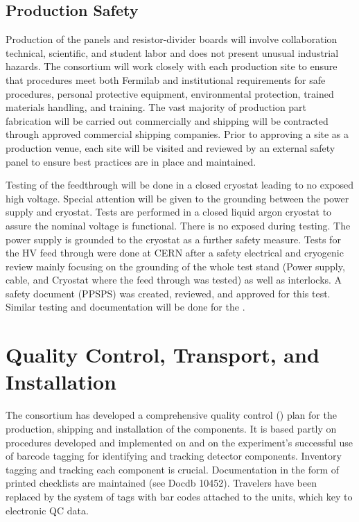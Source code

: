 \subsection{Production Safety}
\label{sec:fdsp-hv-prod-safety}

Production of the  panels and resistor-divider boards will involve collaboration technical, scientific, and student labor and  does not present unusual industrial hazards. The  consortium will work closely with each production site to ensure that procedures meet both Fermilab and institutional requirements for safe procedures, personal protective equipment, environmental protection, trained materials handling, and training. The vast majority of production part fabrication will be carried out commercially and shipping will be contracted through approved commercial shipping companies. Prior to approving a site as a production venue, each site will be visited and reviewed by an external safety panel to ensure best practices are in place and maintained. 

Testing of the  feedthrough will be done in a closed cryostat leading to no exposed high voltage.  Special attention will be given to the grounding between the power supply and cryostat. Tests are performed in a closed liquid argon cryostat to assure the nominal voltage is functional.  There is no exposed  during testing.  The power supply is grounded to the cryostat as a further safety measure. Tests for the  HV feed through were done at CERN after a safety electrical and cryogenic review mainly focusing on the grounding of the whole test stand (Power supply, cable, and Cryostat where the feed through was tested) as well as interlocks. A safety document (PPSPS) was created, reviewed, and approved for this test. Similar testing and documentation will be done for the .



\section{Quality Control, Transport, and Installation}
\label{sec:fdsp-hv-transport}
The  consortium has developed a comprehensive quality control ()
plan for the production, shipping and installation of the   components. %
It is based partly on  procedures developed and implemented on  and on the \nova experiment's successful use of barcode tagging for identifying and tracking detector components.  Inventory tagging and tracking each component is crucial. Documentation in the form of printed checklists are maintained (see Docdb 10452). Travelers have been replaced by the system of tags with bar codes attached to the units, which key to electronic QC data.


